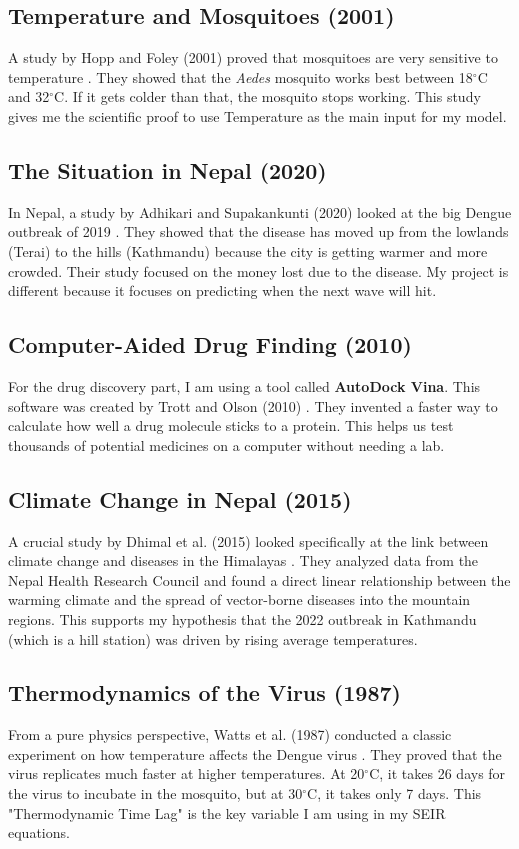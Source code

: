 \documentclass[12pt, a4paper]{article}
\begin{document}
\subsection{Temperature and Mosquitoes (2001)}
A study by Hopp and Foley (2001) proved that mosquitoes are very sensitive to temperature \cite{ref4}. They showed that the \textit{Aedes} mosquito works best between 18$^{\circ}$C and 32$^{\circ}$C. If it gets colder than that, the mosquito stops working. This study gives me the scientific proof to use Temperature as the main input for my model.

\subsection{The Situation in Nepal (2020)}
In Nepal, a study by Adhikari and Supakankunti (2020) looked at the big Dengue outbreak of 2019 \cite{ref3}. They showed that the disease has moved up from the lowlands (Terai) to the hills (Kathmandu) because the city is getting warmer and more crowded. Their study focused on the money lost due to the disease. My project is different because it focuses on predicting when the next wave will hit.

\subsection{Computer-Aided Drug Finding (2010)}
For the drug discovery part, I am using a tool called \textbf{AutoDock Vina}. This software was created by Trott and Olson (2010) \cite{ref6}. They invented a faster way to calculate how well a drug molecule sticks to a protein. This helps us test thousands of potential medicines on a computer without needing a lab.

\subsection{Climate Change in Nepal (2015)}
A crucial study by Dhimal et al. (2015) looked specifically at the link between climate change and diseases in the Himalayas \cite{ref8}. They analyzed data from the Nepal Health Research Council and found a direct linear relationship between the warming climate and the spread of vector-borne diseases into the mountain regions. This supports my hypothesis that the 2022 outbreak in Kathmandu (which is a hill station) was driven by rising average temperatures.

\subsection{Thermodynamics of the Virus (1987)}
From a pure physics perspective, Watts et al. (1987) conducted a classic experiment on how temperature affects the Dengue virus \cite{ref9}. They proved that the virus replicates much faster at higher temperatures. At 20$^{\circ}$C, it takes 26 days for the virus to incubate in the mosquito, but at 30$^{\circ}$C, it takes only 7 days. This "Thermodynamic Time Lag" is the key variable I am using in my SEIR equations.
\end{document}
